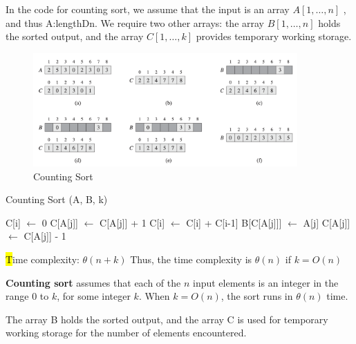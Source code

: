 In the code for counting sort, we assume that the input is an array $A[1,\dots,n]$ , and thus A:lengthDn. We require two other arrays: the array $B[1,\dots,n]$ holds the sorted output, and the array $C[1,\dots,k]$ provides temporary working storage.

\begin{figure}[H]
    \centering
    \includegraphics[width=0.9\textwidth]{assets/countingsort.png}
    \caption{Counting Sort \cite{cormen2022introduction}}
\end{figure}

\begin{algorithm}[H]
    \caption{Counting Sort (A, B, k)}
    \begin{algorithmic}[1]
            \State C[i] $\gets$ 0
        \EndFor
            \State C[A[j]] $\gets$ C[A[j]] + 1
            \State {}
        \EndFor
            \State C[i] $\gets$ C[i] + C[i-1]
            \State {}
        \EndFor
            \State B[C[A[j]]] $\gets$ A[j]
            \State C[A[j]] $\gets$ C[A[j]] - 1
        \EndFor
    \end{algorithmic}
    \hl
    Time complexity: $\theta(n+k)$
    Thus, the time complexity is $\theta(n)$ if $k = O(n)$
\end{algorithm}

\begin{observationblock}[k]
\textbf{Counting sort} assumes that each of the $n$ input elements is an integer in the range $0$ to $k$, for some integer $k$. When $k = O(n)$, the sort runs in $\theta(n)$ time.
\end{observationblock}

The array B holds the sorted output, and the array C is used for temporary working storage for the number of elements encountered. 

